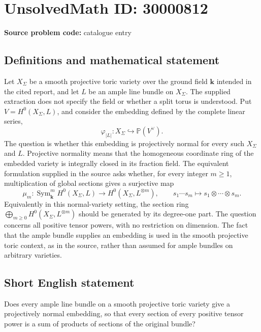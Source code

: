 \documentclass[11pt]{article}
\newcommand{\PP}{\mathbb{P}}
\begin{document}
\section*{UnsolvedMath ID: 30000812}
\textbf{Source problem code:} catalogue entry
\subsection{Definitions and mathematical statement}
Let \(X_\Sigma\) be a smooth projective toric variety over the ground field \(\mathbf k\) intended in the cited report, and let \(L\) be an ample line bundle on \(X_\Sigma\). The supplied extraction does not specify the field or whether a split torus is understood. Put \(V=H^0(X_\Sigma,L)\), and consider the embedding defined by the complete linear series,
\[
\varphi_{|L|}:X_\Sigma\hookrightarrow\PP(V^\vee).
\]
The question is whether this embedding is projectively normal for every such \(X_\Sigma\) and \(L\). Projective normality means that the homogeneous coordinate ring of the embedded variety is integrally closed in its fraction field. The equivalent formulation supplied in the source asks whether, for every integer \(m\geq1\), multiplication of global sections gives a surjective map
\[
\mu_m:\operatorname{Sym}_{\mathbf k}^{m}H^0(X_\Sigma,L)
\longrightarrow H^0(X_\Sigma,L^{\otimes m}),
\qquad
s_1\cdots s_m\longmapsto s_1\otimes\cdots\otimes s_m.
\]
Equivalently in this normal-variety setting, the section ring \(\bigoplus_{m\geq0}H^0(X_\Sigma,L^{\otimes m})\) should be generated by its degree-one part. The question concerns all positive tensor powers, with no restriction on dimension. The fact that the ample bundle supplies an embedding is used in the smooth projective toric context, as in the source, rather than assumed for ample bundles on arbitrary varieties.
\subsection{Short English statement}
Does every ample line bundle on a smooth projective toric variety give a projectively normal embedding, so that every section of every positive tensor power is a sum of products of sections of the original bundle?
\end{document}
